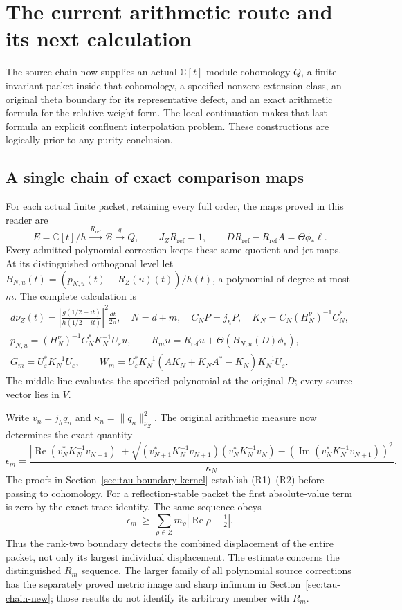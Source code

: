 \section{The current arithmetic route and its next calculation}
\label{sec:research-state}
The source chain now supplies an actual \(\mathbb C[t]\)-module
cohomology \(Q\), a finite invariant packet inside that cohomology,
a specified nonzero extension class, an original theta boundary
for its representative defect, and an exact arithmetic formula
for the relative weight form. The local continuation makes that
last formula an explicit confluent interpolation problem.
These constructions are logically prior to any purity conclusion.

\subsection{A single chain of exact comparison maps}
For each actual finite packet, retaining every full order, the
maps proved in this reader are
\[
 E=\mathbb C[t]/h
 \xrightarrow{\,R_{\mathrm{ref}}\,}\mathscr B
 \xrightarrow{\,q\,}Q,\qquad
 J_ZR_{\mathrm{ref}}=1,\qquad
 DR_{\mathrm{ref}}-R_{\mathrm{ref}}A
       =\Theta\phi_*\ell .
\]
Every admitted polynomial correction keeps these same quotient
and jet maps. At its distinguished orthogonal level let \(B_{N,u}(t)=(p_{N,u}(t)-R_Z(u)(t))/h(t)\), a polynomial of degree at most \(m\). The complete calculation is
\[
\begin{gathered}
 d\nu_Z(t)=\left|\frac{g(1/2+it)}{h(1/2+it)}\right|^2
       \frac{dt}{2\pi},\quad N=d+m,\quad
 C_NP=j_hP,\quad
 K_N=C_N(H_N^\nu)^{-1}C_N^*,\\
 p_{N,u}=(H_N^\nu)^{-1}C_N^*K_N^{-1}U_\varepsilon u,\qquad
 R_mu=R_{\mathrm{ref}}u+
       \Theta(B_{N,u}(D)\phi_*),\\
 G_m=U_\varepsilon^*K_N^{-1}U_\varepsilon,\qquad
 W_m=U_\varepsilon^*K_N^{-1}
     (AK_N+K_NA^*-K_N)K_N^{-1}U_\varepsilon .
\end{gathered}
\tag{R1}
\]
The middle line evaluates the specified polynomial at the original \(D\); every source vector lies in \(V\).

Write \(v_n=j_hq_n\) and \(\kappa_n=\|q_n\|_{\nu_Z}^2\).
The original arithmetic measure now determines the exact quantity
\[
 \epsilon_m=
 \frac{|\operatorname{Re}(v_N^*K_N^{-1}v_{N+1})|
 +\sqrt{(v_{N+1}^*K_N^{-1}v_{N+1})(v_N^*K_N^{-1}v_N)
       -(\operatorname{Im}(v_N^*K_N^{-1}v_{N+1}))^2}}
      {\kappa_N}.
 \tag{R2}
\]
The proofs in Section~\ref{sec:tau-boundary-kernel} establish
(R1)--(R2) before passing to cohomology.
For a reflection-stable packet the first absolute-value term is
zero by the exact trace identity. The same sequence obeys
\[
 \epsilon_m\ \geq\
       \sum_{\rho\in Z}m_\rho
                   |\operatorname{Re}\rho-\tfrac12|.
 \tag{R3}
\]
Thus the rank-two boundary detects the combined displacement of
the entire packet, not only its largest individual displacement.
The estimate concerns the distinguished \(R_m\) sequence.
The larger family of all polynomial source corrections has the
separately proved metric image and sharp infimum in
Section~\ref{sec:tau-chain-new}; those results do not identify
its arbitrary member with \(R_m\).

